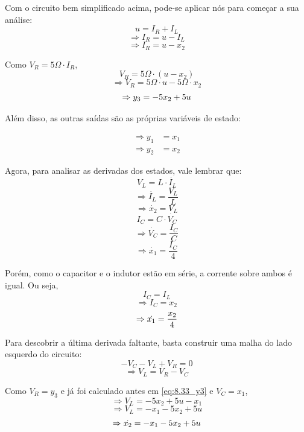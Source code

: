 \documentclass{report}
\begin{document}
Com o circuito bem simplificado acima, pode-se aplicar nós para começar a sua análise:
$$ u = I_R + I_L $$
$$ \Rightarrow I_R = u - I_L $$
$$ \Rightarrow I_R = u - x_2 $$

Como $ V_R = 5\Omega \cdot I_R $,
$$ V_R = 5\Omega \cdot (u - x_2) $$
$$ \Rightarrow V_R = 5\Omega \cdot u - 5\Omega \cdot x_2 $$
\begin{equation}
    \label{eq:8.33_y3}
    \centering
    \Rightarrow y_3 = - 5x_2 + 5u
\end{equation}

Além disso, as outras saídas são as próprias variáveis de estado:
\vspace*{-1.5\baselineskip}
\begin{center}
    \begin{align}
        \label{eq:8.33_y1}
        \Rightarrow y_1 &= x_1 \\
        \label{eq:8.33_y2}
        \Rightarrow y_2 &= x_2
    \end{align}
\end{center}

Agora, para analisar as derivadas dos estados, vale lembrar que:
$$ V_L = L \cdot \dot{I_L} $$
$$ \Rightarrow \dot{I_L} = \frac{V_L}{L} $$
$$ \Rightarrow \dot{x_2} = V_L $$
$$ I_C = C \cdot \dot{V_C} $$
$$ \Rightarrow \dot{V_C} = \frac{I_C}{C} $$
$$ \Rightarrow \dot{x_1} = \frac{I_C}{4} $$

Porém, como o capacitor e o indutor estão em série, a corrente sobre ambos é igual. Ou seja,
$$ I_C = I_L $$
$$ \Rightarrow I_C = x_2 $$
\begin{equation}
    \label{eq:8.33_x1'}
    \centering
    \Rightarrow \dot{x_1} = \frac{x_2}{4}
\end{equation}

Para descobrir a última derivada faltante, basta construir uma malha do lado esquerdo do circuito:
$$ -V_C -V_L + V_R = 0 $$
$$ \Rightarrow V_L = V_R - V_C $$

Como $ V_R = y_3 $ e já foi calculado antes em \ref{eq:8.33_y3} e $ V_C = x_1 $,
$$ \Rightarrow V_L = -5x_2 + 5u - x_1 $$
$$ \Rightarrow V_L = -x_1 -5x_2 + 5u $$
\begin{equation}
    \label{eq:8.33_x2'}
    \centering
    \Rightarrow \dot{x_2} = -x_1 -5x_2 + 5u
\end{equation}
\end{document}
